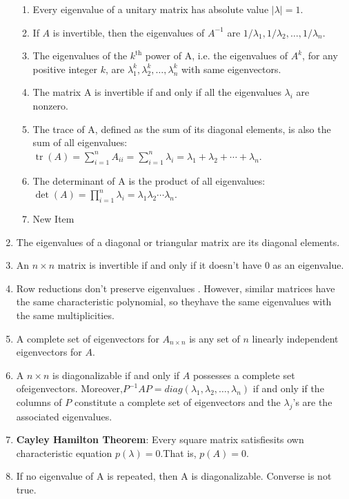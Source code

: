 \documentclass[a4paper,oneside]{book}
\begin{document}
\begin{enumerate}
\begin{enumerate}
\item Every eigenvalue of a unitary matrix has absolute value $|\lambda| = 1$.
\item If $A$ is invertible, then the eigenvalues of $A^{-1}$ are $1/\lambda_1,1/\lambda_2,\dots,1/\lambda_n$.
\item The eigenvalues of the $k^{\text{th}}$ power of A, i.e. the eigenvalues of $A^k$, for any positive integer $k$, are $\lambda_1^k,\lambda_2^k,\dots,\lambda_n^k$ with same eigenvectors.
\item The matrix A is invertible if and only if all the eigenvalues $\lambda_i$ are nonzero.
\item The trace of A, defined as the sum of its diagonal elements, is also the sum of all eigenvalues:
$\operatorname{tr}(A) = \sum_{i=1}^n A_{i i} = \sum_{i=1}^n \lambda_i = \lambda_1+ \lambda_2 +\cdots+ \lambda_n$.
\item The determinant of A is the product of all eigenvalues:
$\operatorname{det}(A) = \prod_{i=1}^n \lambda_i=\lambda_1\lambda_2\cdots\lambda_n$.
\item New Item
\end{enumerate}
\item The eigenvalues of a diagonal or triangular matrix are its diagonal elements.
\item An $n \times n$ matrix is invertible if and only if it doesn't have 0 as an eigenvalue.
\item Row reductions don't preserve eigenvalues . However, similar matrices have the same characteristic polynomial, so theyhave the same eigenvalues with the same multiplicities.
\item A complete set of eigenvectors for $A_{n \times n}$ is any set of $n$ linearly independent eigenvectors for $A$.
\item A $n \times n$ is diagonalizable if and only if $A$ possesses a complete set ofeigenvectors. Moreover,$P^{−1}AP = diag(\lambda_1, \lambda_2, \ldots, \lambda_n)$ if and only if the columns of $P$ constitute a complete set of eigenvectors and the $\lambda_j$'s are the associated eigenvalues.
\item \textbf{Cayley Hamilton Theorem}: Every square matrix satisfiesits own characteristic equation $p(\lambda) = 0$.That is, $p(A) = 0$.
\item If no eigenvalue of A is repeated, then A is diagonalizable. Converse is not true.
\end{enumerate}
\end{document}
